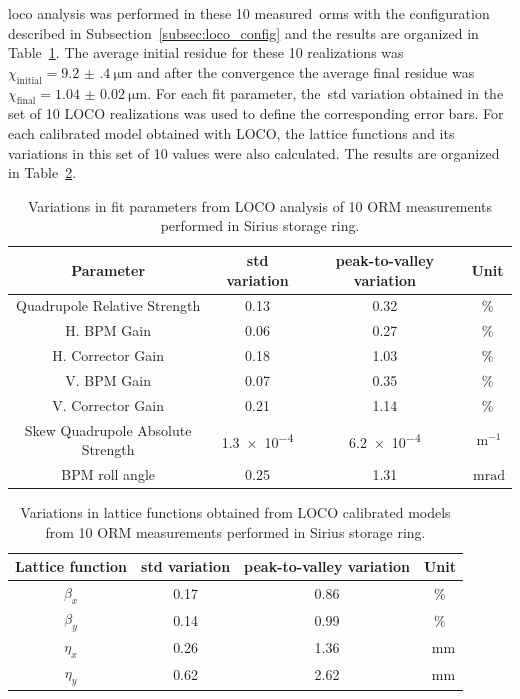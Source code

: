 \gls{loco} analysis was performed in these 10 measured~\glspl{orm} with the configuration described in Subsection~\ref{subsec:loco_config} and the results are organized in Table~\ref{tab:fit_var}. The average initial residue for these 10 realizations was $\chi_{\mathrm{initial}} = \SI{9.2(4)}{\micro\meter}$ and after the convergence the average final residue was $\chi_{\mathrm{final}} = \SI{1.04(2)}{\micro\meter}$. For each fit parameter, the~\gls{std} variation obtained in the set of 10 LOCO realizations was used to define the corresponding error bars. For each calibrated model obtained with LOCO, the lattice functions and its variations in this set of 10 values were also calculated. The results are organized in Table~\ref{tab:twiss_var}. 
\begin{table}
    \centering
    \caption{Variations in fit parameters from LOCO analysis of 10 ORM measurements performed in Sirius storage ring.}
    \label{tab:fit_var}
    \begin{tabular}{cccc}
        \toprule\toprule
        Parameter & std variation & peak-to-valley variation & Unit \\
        \hline
        Quadrupole Relative Strength     & 0.13 & 0.32 & \% \\  
        H. BPM Gain             & 0.06 & 0.27 & \%\\
        H. Corrector Gain       & 0.18 & 1.03 & \%\\
        V. BPM  Gain             & 0.07 & 0.35 & \%\\
        V. Corrector Gain       & 0.21 & 1.14 & \%\\
        Skew Quadrupole Absolute Strength& \num{1.3e-4} & \num{6.2e-4} & $\SI{}{\meter^{-1}}$\\
        BPM roll angle                & 0.25 & 1.31 & $\SI{}{\milli\radian}$ \\
        \bottomrule\bottomrule
    \end{tabular}
\end{table}
\begin{table}
    \centering
    \caption{Variations in lattice functions obtained from LOCO calibrated models from 10 ORM measurements performed in Sirius storage ring.}
    \label{tab:twiss_var}
    \begin{tabular}{cccc}
        \toprule\toprule
        Lattice function & std variation & peak-to-valley variation & Unit \\
        \hline
        $\beta_x$ & \num{0.17}& \num{0.86} & \%\\
        $\beta_y$ & \num{0.14} & \num{0.99}& \% \\
        $\eta_x$ & \num{0.26} & \num{1.36} & \SI{}{\milli\meter}\\
        $\eta_y$ & \num{0.62} & \num{2.62} & \SI{}{\milli\meter} \\
        \bottomrule\bottomrule
    \end{tabular}
\end{table}

